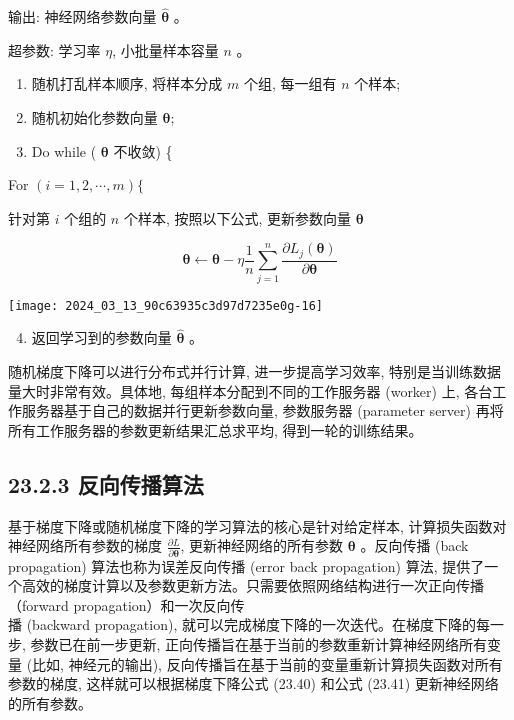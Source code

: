 \documentclass[10pt]{article}
\begin{document}
\begin{CJK*}{UTF8}{bsmi}
输出: 神经网络参数向量 $\hat{\boldsymbol{\theta}}$ 。

超参数: 学习率 $\eta$, 小批量样本容量 $n$ 。

\begin{enumerate}
  \item 随机打乱样本顺序, 将样本分成 $m$ 个组, 每一组有 $n$ 个样本;

  \item 随机初始化参数向量 $\boldsymbol{\theta}$;

  \item Do while ( $\boldsymbol{\theta}$ 不收敛) \{

\end{enumerate}

For $(i=1,2, \cdots, m)\{$

针对第 $i$ 个组的 $n$ 个样本, 按照以下公式, 更新参数向量 $\boldsymbol{\theta}$

$$
\boldsymbol{\theta} \leftarrow \boldsymbol{\theta}-\eta \frac{1}{n} \sum_{j=1}^{n} \frac{\partial L_{j}(\boldsymbol{\theta})}{\partial \boldsymbol{\theta}}
$$

\begin{center}
\texttt{[image: 2024\_03\_13\_90c63935c3d97d7235e0g-16]}
\end{center}

\begin{enumerate}
  \setcounter{enumi}{3}
  \item 返回学习到的参数向量 $\hat{\boldsymbol{\theta}}$ 。
\end{enumerate}

随机梯度下降可以进行分布式并行计算, 进一步提高学习效率, 特别是当训练数据量大时非常有效。具体地, 每组样本分配到不同的工作服务器 (worker) 上, 各台工作服务器基于自己的数据并行更新参数向量, 参数服务器 (parameter server) 再将所有工作服务器的参数更新结果汇总求平均, 得到一轮的训练结果。

\subsection*{23.2.3 反向传播算法}
基于梯度下降或随机梯度下降的学习算法的核心是针对给定样本, 计算损失函数对神经网络所有参数的梯度 $\frac{\partial L}{\partial \boldsymbol{\theta}}$, 更新神经网络的所有参数 $\boldsymbol{\theta}$ 。反向传播 (back propagation) 算法也称为误差反向传播 (error back propagation) 算法, 提供了一个高效的梯度计算以及参数更新方法。只需要依照网络结构进行一次正向传播（forward propagation）和一次反向传\\
播 (backward propagation), 就可以完成梯度下降的一次迭代。在梯度下降的每一步, 参数已在前一步更新, 正向传播旨在基于当前的参数重新计算神经网络所有变量 (比如, 神经元的输出), 反向传播旨在基于当前的变量重新计算损失函数对所有参数的梯度, 这样就可以根据梯度下降公式 (23.40) 和公式 (23.41) 更新神经网络的所有参数。


\end{CJK*}
\end{document}
